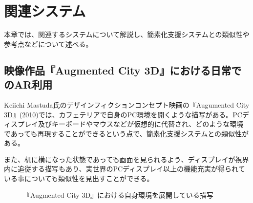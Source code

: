 
\chapter{関連システム}
\label{chap:relatedSystem}

本章では、関連するシステムについて解説し、簡素化支援システムとの類似性や参考点などについて述べる。

\newpage

\section{映像作品『Augmented City 3D』における日常でのAR利用}

Keiichi Mastuda氏のデザインフィクションコンセプト映画の『Augumented City 3D』(2010)では、カフェテリアで自身のPC環境を開くような描写がある。PCディスプレイ及びキーボードやマウスなどが仮想的に代替され、どのような環境であっても再現することができるという点で、簡素化支援システムとの類似性がある。

また、机に横になった状態であっても画面を見られるよう、ディスプレイが視界内に追従する描写もあり、実世界のPCディスプレイ以上の機能充実が得られている事についても類似性を見出すことができる。

\begin{figure}[htbp]
  \begin{minipage}{0.5\hsize}
    \begin{center}
    \end{center}
  \end{minipage}
  \begin{minipage}{0.5\hsize}
    \begin{center}
    \end{center}
  \end{minipage}
  \caption{『Augmented City 3D』における自身環境を展開している描写}
  \cite{arcity}
\end{figure}


